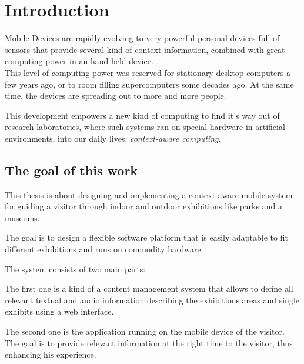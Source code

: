 
\chapter{Introduction} %

\label{introduction} %




Mobile Devices are rapidly evolving to very powerful personal devices full of sensors that provide several kind of context information, combined with great computing power in an hand held device. \\
This level of computing power was reserved for stationary desktop computers a few years ago, or to room filling supercomputers some decades ago.
At the same time, the devices are spreading out to more and more people. 

This development empowers a new kind of computing to find it's way out of research laboratories, where such systems ran on special hardware in artificial environments, into our daily lives: \cite[cf.][]{age-of-context}
\emph{context-aware computing}. 


\section{The goal of this work}

This thesis is about designing and implementing a context-aware mobile system for guiding a visitor through indoor and outdoor exhibitions like parks and a museums.

The goal is to design a flexible software platform that is easily adaptable to fit different exhibitions and runs on commodity hardware. 

The system consists of two main parts:

The first one is a kind of a content management system that allows to define all relevant textual and audio information describing the exhibitions areas and single exhibits using a web interface.

The second one is the application running on the mobile device of the visitor. The goal is to provide relevant information at the right time to the visitor, thus enhancing his experience.

